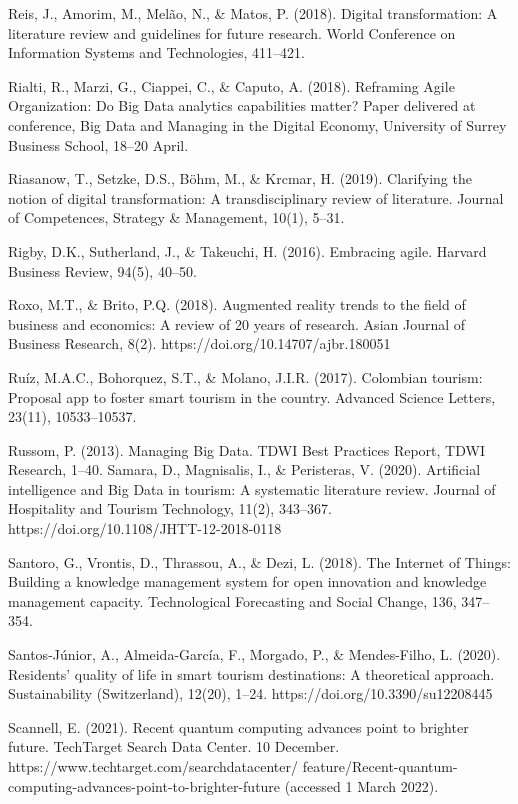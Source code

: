 \documentclass[
  letterpaper,
  DIV=11,
  numbers=noendperiod]{scrreprt}
\begin{document}
Reis, J., Amorim, M., Melão, N., \& Matos, P. (2018). Digital
transformation: A literature review and guidelines for future research.
World Conference on Information Systems and Technologies, 411--421.

Rialti, R., Marzi, G., Ciappei, C., \& Caputo, A. (2018). Reframing
Agile Organization: Do Big Data analytics capabilities matter? Paper
delivered at conference, Big Data and Managing in the Digital Economy,
University of Surrey Business School, 18--20 April.

Riasanow, T., Setzke, D.S., Böhm, M., \& Krcmar, H. (2019). Clarifying
the notion of digital transformation: A transdisciplinary review of
literature. Journal of Competences, Strategy \& Management, 10(1),
5--31.

Rigby, D.K., Sutherland, J., \& Takeuchi, H. (2016). Embracing agile.
Harvard Business Review, 94(5), 40--50.

Roxo, M.T., \& Brito, P.Q. (2018). Augmented reality trends to the field
of business and economics: A review of 20 years of research. Asian
Journal of Business Research, 8(2). https://doi.org/10.14707/ajbr.180051

Ruíz, M.A.C., Bohorquez, S.T., \& Molano, J.I.R. (2017). Colombian
tourism: Proposal app to foster smart tourism in the country. Advanced
Science Letters, 23(11), 10533--10537.

Russom, P. (2013). Managing Big Data. TDWI Best Practices Report, TDWI
Research, 1--40. Samara, D., Magnisalis, I., \& Peristeras, V. (2020).
Artificial intelligence and Big Data in tourism: A systematic literature
review. Journal of Hospitality and Tourism Technology, 11(2), 343--367.
https://doi.org/10.1108/JHTT-12-2018-0118

Santoro, G., Vrontis, D., Thrassou, A., \& Dezi, L. (2018). The Internet
of Things: Building a knowledge management system for open innovation
and knowledge management capacity. Technological Forecasting and Social
Change, 136, 347--354.

Santos-Júnior, A., Almeida-García, F., Morgado, P., \& Mendes-Filho, L.
(2020). Residents' quality of life in smart tourism destinations: A
theoretical approach. Sustainability (Switzerland), 12(20), 1--24.
https://doi.org/10.3390/su12208445

Scannell, E. (2021). Recent quantum computing advances point to brighter
future. TechTarget Search Data Center. 10 December.
https://www.techtarget.com/searchdatacenter/
feature/Recent-quantum-computing-advances-point-to-brighter-future
(accessed 1 March 2022).
\end{document}
